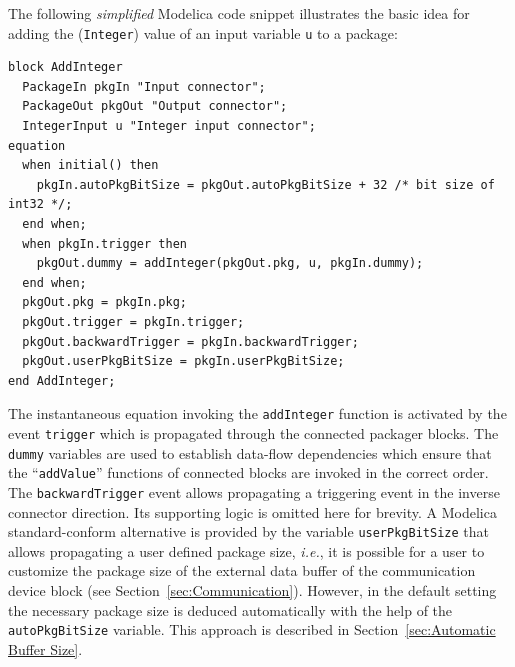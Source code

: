 \documentclass{resources/modelica}
\newcommand{\modelica}[1]{\lstinline[language=modelica]|#1|}
\begin{document}
The
following \emph{simplified} Modelica code snippet illustrates the basic idea for
adding the (\modelica{Integer}) value of an input variable \modelica{u} to a package:
\begin{lstlisting}[language=modelica]
block AddInteger
  PackageIn pkgIn "Input connector";
  PackageOut pkgOut "Output connector";
  IntegerInput u "Integer input connector";
equation
  when initial() then
    pkgIn.autoPkgBitSize = pkgOut.autoPkgBitSize + 32 /* bit size of int32 */;
  end when;
  when pkgIn.trigger then
    pkgOut.dummy = addInteger(pkgOut.pkg, u, pkgIn.dummy);
  end when;
  pkgOut.pkg = pkgIn.pkg;
  pkgOut.trigger = pkgIn.trigger;
  pkgOut.backwardTrigger = pkgIn.backwardTrigger;
  pkgOut.userPkgBitSize = pkgIn.userPkgBitSize;
end AddInteger;
\end{lstlisting}
The instantaneous equation invoking the \mbox{\modelica{addInteger}} function is
activated by the event \modelica{trigger} which is propagated through the connected packager blocks.
The \modelica{dummy} variables are used to establish data-flow dependencies
which ensure that the ``\modelica{addValue}'' functions of connected
blocks are invoked in the correct order. The \modelica{backwardTrigger} event
allows propagating a triggering event in the inverse connector direction.
Its supporting logic is omitted here for brevity. A Modelica standard-conform alternative is provided by the
variable \modelica{userPkgBitSize} that allows propagating a user defined package size, \textit{i.e.}, it is possible for a
user to customize the package size of the external data buffer of the communication device block (see
Section~\ref{sec:Communication}). However,
in the default setting the necessary package size is deduced automatically
with the help of the \modelica{autoPkgBitSize} variable. This approach is
described in Section~\ref{sec:Automatic Buffer Size}.
\end{document}
